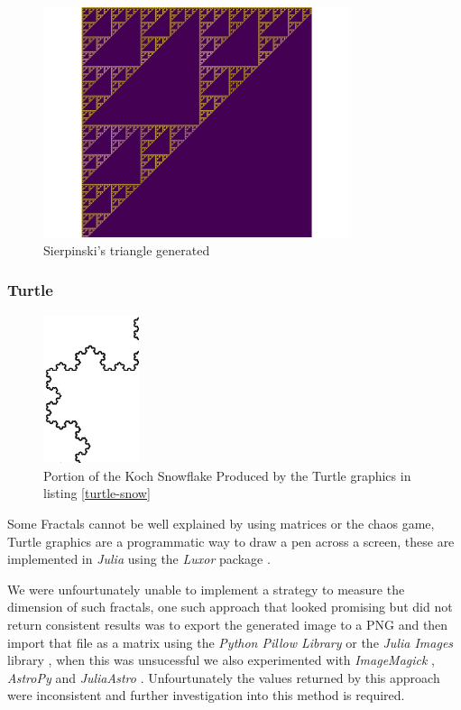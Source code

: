 \documentclass[a4paper,11pt,twoside]{article}
\begin{document}
\begin{figure}[htbp]
\centering
\includegraphics[width=9cm]{media/pascal-sierpinsky-triangle.png}
\caption{\label{fig:pascal-sierpinsky}Sierpinski's triangle generated}
\end{figure}
\subsubsection{Turtle}
\label{turtle}
\begin{figure}
\centering
\includegraphics[width=0.25\textwidth]{../Problems/Chaos/Spirals/snowCurve.png}
\caption{\label{snow-turtle}Portion of the Koch Snowflake Produced by the Turtle graphics in listing \ref{turtle-snow}}
\end{figure}


Some Fractals cannot be well explained by using matrices or the chaos game, Turtle graphics are a programmatic way to draw a pen across a screen, these are implemented in \emph{Julia} using the \emph{Luxor} package \cite{JuliaGraphicsLuxorJl2020}.



We were unfourtunately unable to implement a strategy to measure the dimension
of such fractals, one such approach that looked promising but did not return
consistent results was to export the generated image to a PNG and then import
that file as a matrix using the \emph{Python Pillow Library} \cite{PillowPillowPIL} or
the \emph{Julia Images} library \cite{JuliaImagesImagesJl2020}, when this was
unsucessful we also experimented with \emph{ImageMagick} \cite{llcImageMagick},
\emph{AstroPy} \cite{Astropy} and \emph{JuliaAstro} \cite{JuliaAstroJuliaAstro}.
Unfourtunately the values returned by this approach were inconsistent and
further investigation into this method is required.
\end{document}
